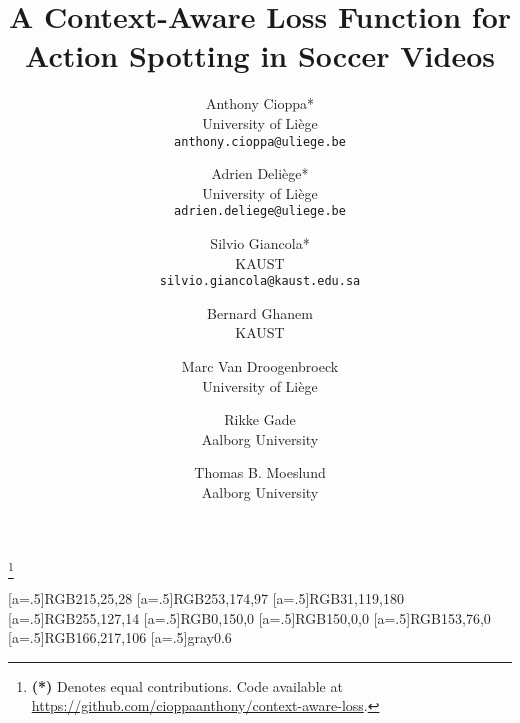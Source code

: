 \documentclass[10pt,twocolumn,letterpaper]{article}
\begin{document}
\title{A Context-Aware Loss Function for Action Spotting in Soccer Videos}

\author{
Anthony Cioppa*\\
{\small University of Li\`ege}\\
{\tt\small anthony.cioppa@uliege.be}
\and
Adrien Deli\`ege*\\
{\small University of Li\`ege}\\
{\tt\small adrien.deliege@uliege.be}
\and
Silvio Giancola*\\
{\small KAUST}\\
{\tt\small silvio.giancola@kaust.edu.sa}
\and
Bernard Ghanem\\
{\small KAUST}\\
\and
Marc Van Droogenbroeck\\
{\small University of Li\`ege}\\
\and
Rikke Gade\\
{\small Aalborg University}\\
\and
Thomas B. Moeslund\\
{\small Aalborg University}\\
}


\maketitle

\newcommand{\mysection}[1]{\vspace{2pt}\noindent\textbf{#1}}
\newcommand{\Table}[1]{Table~\ref{tab:#1}}
\newcommand{\Figure}[1]{Figure~\ref{fig:#1}}
\newcommand{\Equation}[1]{Equation~\eqref{eq:#1}}
\newcommand{\Equations}[2]{Equations \eqref{eq:#1} and \eqref{eq:#2}}
\newcommand{\Section}[1]{Section~\ref{sec:#1}}
\newcommand{\SoccerNet}{SoccerNet~\cite{Giancola_2018_CVPR_Workshops}\xspace}
\newcommand{\ActivityNet}{ActivityNet~\cite{caba2015activitynet}\xspace}

\newcommand\blfootnote[1]{\begingroup
  \renewcommand\thefootnote{}\footnote{#1}\addtocounter{footnote}{-1}\endgroup
}
\blfootnote{\textbf{(*)} Denotes equal contributions. Code available at \url{https://github.com/cioppaanthony/context-aware-loss}.}


\definecolor{myred}[a=.5]{RGB}{215,25,28} 
\definecolor{myorange}[a=.5]{RGB}{253,174,97}
\definecolor{anthoblue}[a=.5]{RGB}{31,119,180}
\definecolor{anthoorange}[a=.5]{RGB}{255,127,14}
\definecolor{anthogreen}[a=.5]{RGB}{0,150,0}
\definecolor{anthored}[a=.5]{RGB}{150,0,0}
\definecolor{anthobrown}[a=.5]{RGB}{153,76,0}
\definecolor{mygreen}[a=.5]{RGB}{166,217,106} 
\definecolor{mygray}[a=.5]{gray}{0.6}
\end{document}
